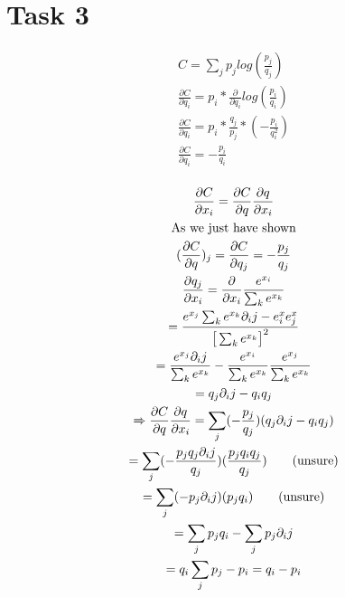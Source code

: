 \section*{Task 3}

\begin{gather*}
C = \sum_j p_j log(\frac{p_j}{q_j}) \\
\frac{\partial C}{\partial q_i} = p_i * \frac{\partial}{\partial q_i} log(\frac{p_i}{q_i}) \\
\frac{\partial C}{\partial q_i} = p_i * \frac{q_j}{p_j} * (-\frac{p_i}{q_i^2}) \\
\frac{\partial C}{\partial q_i} = -\frac{p_i}{q_i} \\
\end{gather*}

\begin{gather*}
\frac{\partial C}{\partial x_i} = \frac{\partial C}{\partial q} \frac{\partial q}{\partial x_i} \\
\text{As we just have shown}\\
(\frac{\partial C}{\partial q})_j = \frac{\partial C}{\partial q_j} = -\frac{p_j}{q_j} \\
\frac{\partial q_j}{\partial x_i} = \frac{\partial}{\partial x_i} \frac{e^{x_i}}{\sum_k e^{x_k}} \\
= \frac{e^{x_j} \sum_k e^{x_k} \partial _ij - e^x_i e^x_j}{\big[ \sum_k e^{x_k} \big]^2} \\
= \frac{e^{x_j} \partial _ij}{\sum_k e^{x_k}} - \frac{e^{x_i}}{\sum_k e^{x_k}} \frac{e^{x_j}}{\sum_k e^{x_k}} \\
= q_j \partial _ij - q_i q_j \\
\xRightarrow[]{}
\frac{\partial C}{\partial q} \frac{\partial q}{\partial x_i} = \sum_j (-\frac{p_j}{q_j})(q_j \partial _ij - q_iq_j) \\
= \sum_j (-\frac{p_j q_j \partial _ij}{q_j})(\frac{p_j q_iq_j}{q_j}) \tag{unsure} \\
= \sum_j (-p_j \partial _ij)(p_j q_i) \tag{unsure}\\
= \sum_j p_jq_i - \sum_j p_j \partial _ij \\
= q_i \sum_j p_j - p_i
= q_i - p_i
\end{gather*}


\clearpage
